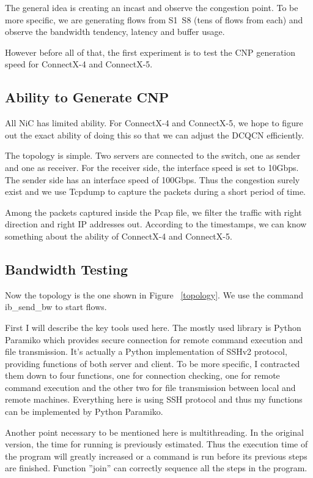 \documentclass{article}
\begin{document}
The general idea is creating an incast and observe the congestion point.
To be more specific, we are generating flows from S1~S8 (tens of flows from each) and observe the bandwidth tendency, latency and buffer usage.

However before all of that, the first experiment is to test the CNP generation speed for ConnectX-4 and ConnectX-5. 

\subsection{Ability to Generate CNP}

All NiC has limited ability. For ConnectX-4 and ConnectX-5, we hope to figure out the exact ability of doing this so that we can adjust the DCQCN efficiently.

The topology is simple. Two servers are connected to the switch, one as sender and one as receiver.
For the receiver side, the interface speed is set to 10Gbps. The sender side has an interface speed of 100Gbps.
Thus the congestion surely exist and we use Tcpdump to capture the packets during a short period of time.

Among the packets captured inside the Pcap file, we filter the traffic with right direction and right IP addresses out.
According to the timestamps, we can know something about the ability of ConnectX-4 and ConnectX-5.

\subsection{Bandwidth Testing}

Now the topology is the one shown in Figure ~\ref{topology}.
We use the command ib\_send\_bw to start flows.


First I will describe the key tools used here.
The mostly used library is Python Paramiko which provides secure connection for remote command execution and file transmission.
It's actually a Python implementation of SSHv2 protocol, providing functions of both server and client.
To be more specific, I contracted them down to four functions, one for connection checking, one for remote command execution and the other two for file
transmission between local and remote machines.
Everything here is using SSH protocol and thus my functions can be implemented by Python Paramiko.

Another point necessary to be mentioned here is multithreading. In the original version, the time for running is previously estimated.
Thus the execution time of the program will greatly increased or a command is run before its previous steps are finished.
Function ''join'' can correctly sequence all the steps in the program.
\end{document}
